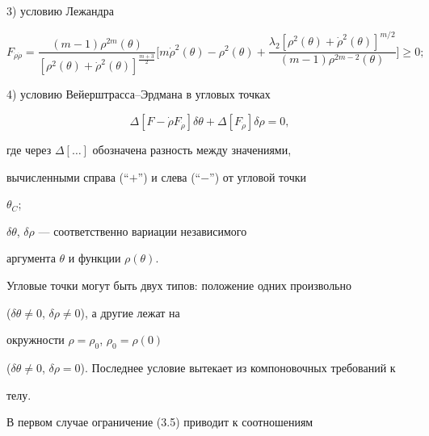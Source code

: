 3) условию Лежандра


\begin{equation}


F_{\Dot{\rho} \Dot{\rho}} =


\frac {(m - 1) \rho^{2m}(\theta)}


{[\rho^2(\theta) + \Dot{\rho}^2(\theta)]^{\frac {m+3}{2}}}


\bigg[ m \Dot{\rho}^2(\theta) - \rho^2(\theta) + \frac


{\lambda_2 [\rho^2(\theta) +


\Dot{\rho}^2 (\theta)]^{m/2}}{ (m - 1) \rho^{2m-2}(\theta)}


\bigg] \geq 0;


\end{equation}





4) условию Вейерштрасса--Эрдмана в угловых точках


\begin{equation}


\Delta [ F - \Dot{\rho} F_{\Dot{\rho}} ] \delta \theta +


\Delta [ F_{\Dot{\rho}} ] \delta \rho = 0, 


\end{equation}


где через $\Delta[\dotsc]$ обозначена разность между значениями,


вычисленными справа (``$+$'') и слева (``$-$'') от угловой точки


$\theta_C$;


$\delta \theta$, $\delta \rho$ --- соответственно вариации независимого


аргумента $\theta$ и функции $\rho( \theta )$.





Угловые точки могут быть двух типов: положение одних произвольно


($\delta \theta \neq 0$, $ \delta \rho \neq 0$), а другие лежат на


окружности $\rho = \rho_0$, $\rho_0 = \rho (0)$


($\delta \theta \neq 0$, $\delta \rho =


0$). Последнее условие вытекает из компоновочных требований к


телу.





В первом случае ограничение (3.5) приводит к соотношениям


